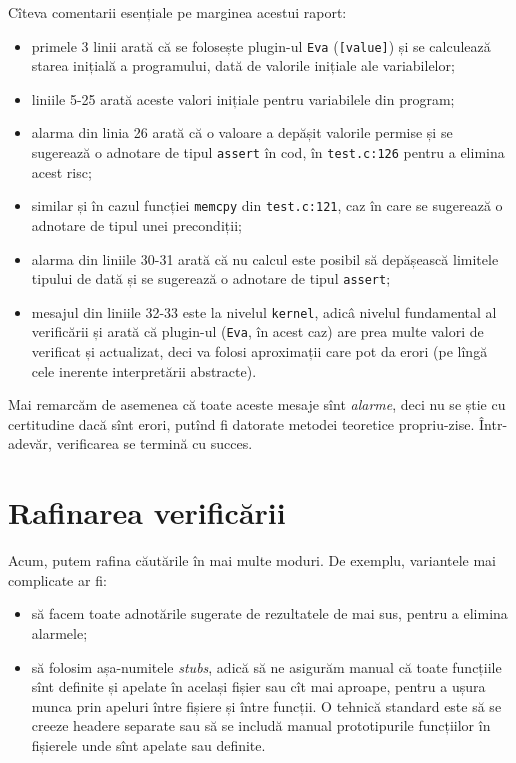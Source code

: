 Cîteva comentarii esențiale pe marginea acestui raport:
\begin{itemize}
\item primele 3 linii arată că se folosește plugin-ul \texttt{Eva} (\texttt{[value]}) și
  se calculează starea inițială a programului, dată de valorile inițiale ale variabilelor;
\item liniile 5-25 arată aceste valori inițiale pentru variabilele din program;
\item alarma din linia 26 arată că o valoare a depășit valorile permise și se sugerează
  o adnotare de tipul \texttt{assert} în cod, în \texttt{test.c:126} pentru a elimina
  acest risc;
\item similar și în cazul funcției \texttt{memcpy} din \texttt{test.c:121}, caz în care
  se sugerează o adnotare de tipul unei precondiții;
\item alarma din liniile 30-31 arată că nu calcul este posibil să depășească limitele
  tipului de dată și se sugerează o adnotare de tipul \texttt{assert};
\item mesajul din liniile 32-33 este la nivelul \texttt{kernel}, adicâ nivelul fundamental
  al verificării și arată că plugin-ul (\texttt{Eva}, în acest caz) are prea multe valori
  de verificat și actualizat, deci va folosi aproximații care pot da erori (pe lîngă cele
  inerente interpretării abstracte).
\end{itemize}

Mai remarcăm de asemenea că toate aceste mesaje sînt \emph{alarme}, deci nu se știe
cu certitudine dacă sînt erori, putînd fi datorate metodei teoretice propriu-zise.
Într-adevăr, verificarea se termină cu succes.

\section{Rafinarea verificării}

\indent\indent Acum, putem rafina căutările în mai multe moduri. De exemplu, variantele
mai complicate ar fi:
\begin{itemize}
\item să facem toate adnotările sugerate de rezultatele de mai sus, pentru a elimina
  alarmele;
\item să folosim așa-numitele \emph{stubs}, adică să ne asigurăm manual că toate funcțiile
  sînt definite și apelate în același fișier sau cît mai aproape, pentru a ușura munca
  prin apeluri între fișiere și între funcții. O tehnică standard este să se creeze
  headere separate sau să se includă manual prototipurile funcțiilor în fișierele
  unde sînt apelate sau definite.
\end{itemize}

